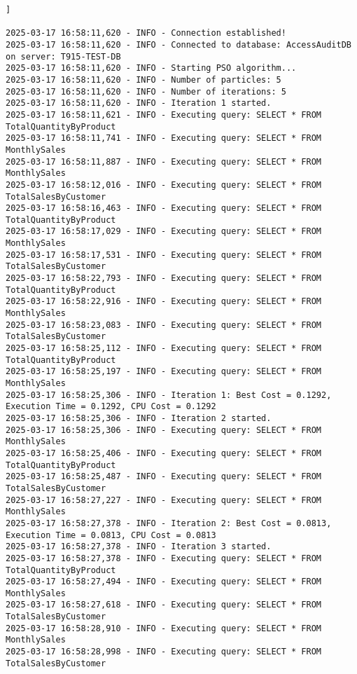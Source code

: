 

\begin{lstlisting}[style=pythonstyle, caption={Output from python code }, label={lst:pso_query_optimization}]]

2025-03-17 16:58:11,620 - INFO - Connection established!
2025-03-17 16:58:11,620 - INFO - Connected to database: AccessAuditDB on server: T915-TEST-DB
2025-03-17 16:58:11,620 - INFO - Starting PSO algorithm...
2025-03-17 16:58:11,620 - INFO - Number of particles: 5
2025-03-17 16:58:11,620 - INFO - Number of iterations: 5
2025-03-17 16:58:11,620 - INFO - Iteration 1 started.
2025-03-17 16:58:11,621 - INFO - Executing query: SELECT * FROM TotalQuantityByProduct
2025-03-17 16:58:11,741 - INFO - Executing query: SELECT * FROM MonthlySales
2025-03-17 16:58:11,887 - INFO - Executing query: SELECT * FROM MonthlySales
2025-03-17 16:58:12,016 - INFO - Executing query: SELECT * FROM TotalSalesByCustomer
2025-03-17 16:58:16,463 - INFO - Executing query: SELECT * FROM TotalQuantityByProduct
2025-03-17 16:58:17,029 - INFO - Executing query: SELECT * FROM MonthlySales
2025-03-17 16:58:17,531 - INFO - Executing query: SELECT * FROM TotalSalesByCustomer
2025-03-17 16:58:22,793 - INFO - Executing query: SELECT * FROM TotalQuantityByProduct
2025-03-17 16:58:22,916 - INFO - Executing query: SELECT * FROM MonthlySales
2025-03-17 16:58:23,083 - INFO - Executing query: SELECT * FROM TotalSalesByCustomer
2025-03-17 16:58:25,112 - INFO - Executing query: SELECT * FROM TotalQuantityByProduct
2025-03-17 16:58:25,197 - INFO - Executing query: SELECT * FROM MonthlySales
2025-03-17 16:58:25,306 - INFO - Iteration 1: Best Cost = 0.1292, Execution Time = 0.1292, CPU Cost = 0.1292
2025-03-17 16:58:25,306 - INFO - Iteration 2 started.
2025-03-17 16:58:25,306 - INFO - Executing query: SELECT * FROM MonthlySales
2025-03-17 16:58:25,406 - INFO - Executing query: SELECT * FROM TotalQuantityByProduct
2025-03-17 16:58:25,487 - INFO - Executing query: SELECT * FROM TotalSalesByCustomer
2025-03-17 16:58:27,227 - INFO - Executing query: SELECT * FROM MonthlySales
2025-03-17 16:58:27,378 - INFO - Iteration 2: Best Cost = 0.0813, Execution Time = 0.0813, CPU Cost = 0.0813
2025-03-17 16:58:27,378 - INFO - Iteration 3 started.
2025-03-17 16:58:27,378 - INFO - Executing query: SELECT * FROM TotalQuantityByProduct
2025-03-17 16:58:27,494 - INFO - Executing query: SELECT * FROM MonthlySales
2025-03-17 16:58:27,618 - INFO - Executing query: SELECT * FROM TotalSalesByCustomer
2025-03-17 16:58:28,910 - INFO - Executing query: SELECT * FROM MonthlySales
2025-03-17 16:58:28,998 - INFO - Executing query: SELECT * FROM TotalSalesByCustomer

\end{lstlisting}
